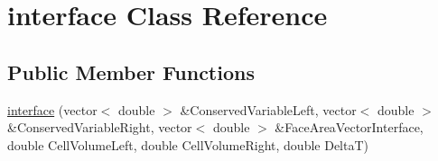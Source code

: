 \hypertarget{classinterface}{}\section{interface Class Reference}
\label{classinterface}
\subsection*{Public Member Functions}
\begin{DoxyCompactItemize}
\item 
\hyperlink{classinterface_a7abecc6e69fdb7b0dc3a4ad0abbe4f93}{interface} (vector$<$ double $>$ \&Conserved\+Variable\+Left, vector$<$ double $>$ \&Conserved\+Variable\+Right, vector$<$ double $>$ \&Face\+Area\+Vector\+Interface, double Cell\+Volume\+Left, double Cell\+Volume\+Right, double DeltaT)
\end{DoxyCompactItemize}
